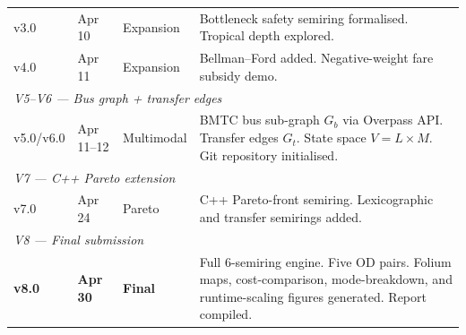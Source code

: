 \documentclass[12pt,a4paper]{article}
\begin{document}
\begin{table}[H]
\begin{tabularx}{\textwidth}{l l l X}
v3.0 & Apr 10 & Expansion &
Bottleneck safety semiring formalised. Tropical depth explored. \\

v4.0 & Apr 11 & Expansion &
Bellman--Ford added. Negative-weight fare subsidy demo. \\

\midrule
\multicolumn{4}{l}{\textit{V5--V6 --- Bus graph + transfer edges}} \\[2pt]

v5.0/v6.0 & Apr 11--12 & Multimodal &
BMTC bus sub-graph $G_b$ via Overpass API. Transfer edges $G_t$.
State space $V = L \times M$. Git repository initialised. \\

\midrule
\multicolumn{4}{l}{\textit{V7 --- C++ Pareto extension}} \\[2pt]

v7.0 & Apr 24 & Pareto &
C++ Pareto-front semiring. Lexicographic and transfer
semirings added. \\

\midrule
\multicolumn{4}{l}{\textit{V8 --- Final submission}} \\[2pt]

\textbf{v8.0} & \textbf{Apr 30} & \textbf{Final} &
Full 6-semiring engine. Five OD pairs. Folium maps,
cost-comparison, mode-breakdown, and runtime-scaling
figures generated. Report compiled. \\

\bottomrule
\end{tabularx}
\end{table}
\end{document}
